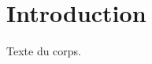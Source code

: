\documentclass{gretsi}
\begin{document}
\maketitle
\section{Introduction}
Texte du corps.
\begin{figure}[h]\centering{}\end{figure}
\end{document}

